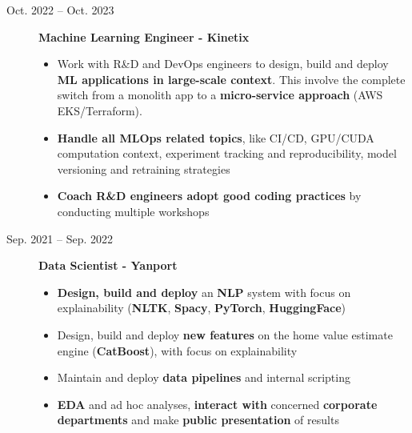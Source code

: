 \documentclass[a4paper,10pt]{article}
\begin{document}
\begin{adjustbox}{valign=t}
\begin{minipage}{0.6\textwidth}
\begin{description}
\begin{itemize}[topsep=0pt]
                \end{itemize}
                \normalsize
            \item[\normalfont \textcolor{ColorOne}{Oct. 2022 -- Oct. 2023}]
                \textbf{Machine Learning Engineer - Kinetix}\\
                \small
                \begin{itemize}[topsep=0pt]
                    \item Work with R\&D and DevOps engineers to design, build and deploy \textbf{ML applications in large-scale context}. This involve the complete switch from a monolith app to a \textbf{micro-service approach} (AWS EKS/Terraform).
                    \item \textbf{Handle all MLOps related topics}, like CI/CD, GPU/CUDA computation context, experiment tracking and reproducibility, model versioning and retraining strategies
                    \item \textbf{Coach R\&D engineers adopt good coding practices} by conducting multiple workshops
                \end{itemize}
                \normalsize
            \item[\normalfont \textcolor{ColorOne}{Sep. 2021 -- Sep. 2022}]
                \textbf{Data Scientist - Yanport}\\
                \small
                \begin{itemize}[topsep=0pt]
                    \item \textbf{Design, build and deploy} an \textbf{NLP} system with focus on explainability (\textbf{NLTK}, \textbf{Spacy}, \textbf{PyTorch}, \textbf{HuggingFace})
                    \item Design, build and deploy \textbf{new features} on the home value estimate engine (\textbf{CatBoost}), with focus on explainability
                    \item Maintain and deploy \textbf{data pipelines} and internal scripting
                    \item \textbf{EDA} and ad hoc analyses, \textbf{interact with} concerned \textbf{corporate departments} and make \textbf{public presentation} of results
                \end{itemize}
                \normalsize
        \end{description}
        \vspace{-1cm}

\end{minipage}
\end{adjustbox}
\end{document}

